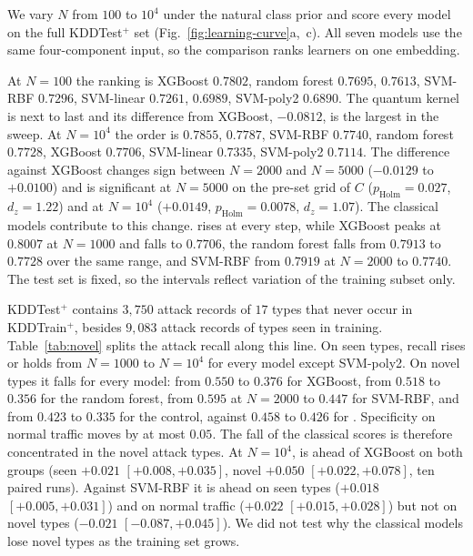



We vary $N$ from $100$ to $10^4$ under the natural class prior and score every model on the full
KDDTest$^+$ set (Fig.~\ref{fig:learning-curve}a,~c). All seven models use the same
four-component input, so the comparison ranks learners on one embedding.

At $N=100$ the ranking is XGBoost $0.7802$, random forest $0.7695$, \QSVMZ{} $0.7613$,
SVM-RBF $0.7296$, SVM-linear $0.7261$, \QSVM{} $0.6989$, SVM-poly2 $0.6890$. The quantum kernel is next to last and
its difference from XGBoost, $-0.0812$, is the largest in the sweep. At $N=10^4$ the order is
\QSVM{} $0.7855$, \QSVMZ{} $0.7787$, SVM-RBF $0.7740$, random forest $0.7728$, XGBoost
$0.7706$, SVM-linear $0.7335$, SVM-poly2 $0.7114$. The difference against XGBoost changes sign between $N=2000$ and $N=5000$
($-0.0129$ to $+0.0100$) and is significant at $N=5000$ on the pre-set grid of $C$
($p_{\mathrm{Holm}}=0.027$, $d_z=1.22$)
and at $N=10^4$ ($+0.0149$, $p_{\mathrm{Holm}}=0.0078$, $d_z=1.07$).
The classical models contribute to this change. \QSVM{} rises at every step, while XGBoost
peaks at $0.8007$ at $N=1000$ and falls to $0.7706$, the random forest falls from $0.7913$ to
$0.7728$ over the same range, and SVM-RBF from $0.7919$ at $N=2000$ to $0.7740$. The test set is
fixed, so the intervals reflect variation of the training subset only.



KDDTest$^+$ contains $3{,}750$ attack records of $17$ types that never occur in KDDTrain$^+$,
besides $9{,}083$ attack records of types seen in training. Table~\ref{tab:novel} splits the
attack recall along this line. On seen types, recall rises or holds from $N=1000$ to $N=10^4$
for every model except SVM-poly2. On novel types it falls for every model: from $0.550$ to
$0.376$ for XGBoost, from $0.518$ to $0.356$ for the random forest, from $0.595$ at $N=2000$ to
$0.447$ for SVM-RBF, and from $0.423$ to $0.335$ for the \Zmap{} control, against $0.458$ to
$0.426$ for \QSVM{}. Specificity on normal traffic moves by at most $0.05$. The fall of the
classical scores is therefore concentrated in the novel attack types. At $N=10^4$, \QSVM{} is
ahead of XGBoost on both groups (seen $+0.021$ $[+0.008,+0.035]$, novel $+0.050$
$[+0.022,+0.078]$, ten paired runs). Against SVM-RBF it is ahead on seen types ($+0.018$
$[+0.005,+0.031]$) and on normal traffic ($+0.022$ $[+0.015,+0.028]$) but not on novel types
($-0.021$ $[-0.087,+0.045]$). We did not test why the classical models lose novel types as the
training set grows.

